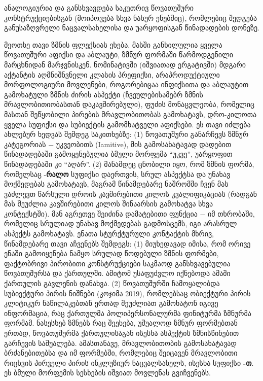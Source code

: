 \begin{otherlanguage}{georgian}
ანალოგიურია და განსხვავდება საკუთრივ წოვათუშური კონსტრუქციებისგან (მოიპოვება სხვა ნახურ ენებშიც), რომლებიც შედგება განუსაზღვრელი ნაცვალსახელისა და უარყოფისგან წინადადების დონეზე.


	მეოთხე თავი ზმნის ფლექსიას ეხება. მასში განხილულია ყველა წოვათუშური აფიქსი და აბლაუტი, ზმნურ ფორმაში წარმოდგენილი მარცხნიდან მარჯვნისკენ. ნომინატივში (იშვიათად ერგატივში) მდგარი აქტანტის აღმნიშნვნელი კლასის პრეფიქსი, არაპროდუქტიული მორფოლოგიური მოვლენები, როგორებიცაა ინფიქსითა და აბლაუტით გამოხატული ზმნის ძირის ასპექტი (ჩვეულებისამებრ ზმნის მრავლობითიობასთან დაკავშირებული), ფუძის მონაცვლეობა, რომელიც მასთან შეწყობილი პირების მრავლობითობას გამოხატავს, დრო-კილოთა ყველა სუფიქსი და სუბიექტის გამომხატველი აფიქსები. ეს თავი იძლება ახლებურ ხედვას შემდეგ საკითხებზე: (1) წოვათუშური განარჩევს ზმნურ კატეგორიას − უკვეობითს (Iamitive), მის გამოსახატავად დადებით წინადადებაში გამოყენებულია ბმული მორფემა “უკვე”,   უარყოფით წინადადებაში კი “აღარ”. (2) მანამდეც ცნობილი იყო, რომ ზმნის ფორმა, რომელსაც
	-\textbf{რალო} სუფიქსი დაერთვის, სრულ ასპექტსა და უნახავ მოქმედებას გამოხატავს, მაგრამ წინამდებარე ნაშრომში ჩვენ მას ვაძლევთ წარსული დროის კავშირებითი კილოს კვალიფიკაციას (რადგან მას შეუძლია კავშირებითი კილოს შინაარსის გამოხატვა სხვა კონტექსტში). მან აგრეთვე შეიძინა დამატებითი ფუნქცია − იმ თხრობაში, რომელიც სრულიად უნახავ მოქმედებას გადმოსცემს, იგი არასრულ ასპექტს გამოხატავს. ენათა სტურქტურული კონტაქტის მხრივ, წინამდებარე თავი აჩვენებს შემდეგს: (1) მიუხედავად იმისა, რომ ორივე ენაში გამოიყენება ნამყო სრულად წოდებული ზმნის ფორმები, ფაქტობრივი პირობითი კონსტრუქციები საკმაოდ განსხვავებულია წოვათუშურსა და ქართულში. ამიტომ უსაფუძვლო იქნებოდა ამაში ქართულის გავლენის დანახვა. (2) წოვათუშურში ჩამოყალიბდა სუბიექტური პირის ნიშნები (კოჯიმა 2019), რომლებსაც ობიექტური პირის კლიტიკურ ნაწილაკებთან ერთად შეუძლიათ გამოხატონ იგივე ინფორმაცია, რაც ქართულმა პოლიპერსონალურმა ფინიტურმა ზმნურმა ფორმამ. ნასესხებ ზმნებს რაც შეეხება, უშუალოდ ზმნურ ფორმებთან ერთად, წოვათუშურმა ქართულისაგან  ისესხა ასპექტის ზმნისწინებით გარჩევის საშუალება. ამასთანავე, მრავლობითობის გამოსახატავად ბრძანებითებსა და იმ ფორმებში, რომლებიც შეიცავენ მრავლობითი რიცხვის პირველი პირის ინკლუზიურ  ნაცვალსახელს, ისესხა სუფიქსი \textbf{-თ}. ეს ბმული მორფემის სესხების იშვიათ მოვლენას გვიჩვენებს.



\end{otherlanguage}
